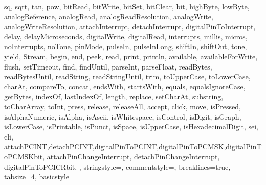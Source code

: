 {{                sq, sqrt, tan, pow, bitRead, bitWrite, bitSet, bitClear, bit, 
                highByte, lowByte, analogReference, analogRead, 
                analogReadResolution, analogWrite, analogWriteResolution, 
                attachInterrupt, detachInterrupt, digitalPinToInterrupt, delay, 
                delayMicroseconds, digitalWrite, digitalRead, interrupts, millis, 
                micros, noInterrupts, noTone, pinMode, pulseIn, pulseInLong, shiftIn, 
                shiftOut, tone, yield, Stream, begin, end, peek, read, print, 
                println, available, availableForWrite, flush, setTimeout, find, 
                findUntil, parseInt, parseFloat, readBytes, readBytesUntil, readString, 
                readStringUntil, trim, toUpperCase, toLowerCase, charAt, compareTo, 
                concat, endsWith, startsWith, equals, equalsIgnoreCase, getBytes, 
                indexOf, lastIndexOf, length, replace, setCharAt, substring, 
                toCharArray, toInt, press, release, releaseAll, accept, click, move, 
                isPressed, isAlphaNumeric, isAlpha, isAscii, isWhitespace, isControl, 
                isDigit, isGraph, isLowerCase, isPrintable, isPunct, isSpace, 
                isUpperCase, isHexadecimalDigit, sei, cli,
                attachPCINT,detachPCINT,digitalPinToPCINT,digitalPinToPCMSK,digitalPinToPCMSKbit,
                attachPinChangeInterrupt, detachPinChangeInterrupt,
                digitalPinToPCICRbit,
                },      
%
%
  stringstyle=\color{arduinoDarkBlue},    
  commentstyle=\color{arduinoGrey},    
%          
%   
%
%
  breaklines=true,                    %
  tabsize=4,         
  basicstyle=\ttfamily  
}
